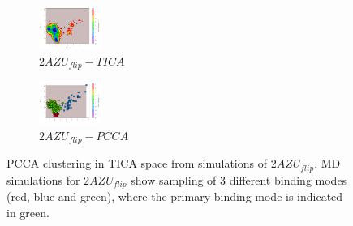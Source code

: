 \begin{figure}[!ht]
\centering
\begin{subfigure}{.5\textwidth}
  \centering
  \includegraphics[width=.9\linewidth]{chapter4/2AZU_flip/2AZU_flip-tica.pdf}
  \caption{$2AZU_{flip}-TICA$}
  \label{sup:2AZU_flip-tica}
\end{subfigure}%
\begin{subfigure}{.5\textwidth}
  \centering
  \includegraphics[width=.9\linewidth]{chapter4/2AZU_flip/2AZU_flip-pcca.pdf}
  \caption{$2AZU_{flip}-PCCA$}
  \label{sup:2AZU_flip-pcca}
\end{subfigure}
\caption{PCCA clustering in TICA space from simulations of $2AZU_{flip}$. MD simulations for $2AZU_{flip}$ show sampling of 3 different binding modes (red, blue and green), where the primary binding mode is indicated in green.}
\label{sup:2AZU_flip-cluster}
\end{figure}